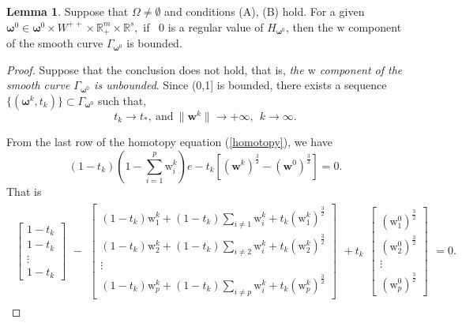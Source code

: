 \documentclass[11pt,pdflatex,sn-mathphys-ay]{sn-jnl}%
\theoremstyle{definition}
\theoremstyle{thmstyleone}%
\theoremstyle{thmstyletwo}%
\newtheorem{lemma}{Lemma}%
\theoremstyle{thmstylethree}%
\begin{document}
	\begin{lemma}\label{fenliangyoujie}
		Suppose that $\Omega \ne \emptyset$ and conditions (A), (B)
		hold. For a given $\bm{\omega}^0\in \bm{\omega}^0\times  W^{++} \times
		\mathbb{R}^{m}_{+}\times \mathbb{R}^s,$ if ~$  0 $ is a regular
		value of $H_{\bm{\omega}^0}$, then the $\text{w}$ component of the smooth curve
		$\Gamma_{\bm{\omega}^0}$ is bounded.
	\end{lemma}
	\vspace{-0.5cm}
	\begin{proof} Suppose that the conclusion does not hold, that is, \textit{the $\text{w}$ component of the smooth curve
			$\Gamma_{\bm{\omega}^0}$ is unbounded}. Since (0,1]
		is bounded, there exists a sequence
		$\{(\bm{\omega}^k,t_k)\}\subset\Gamma_{\bm{\omega}^0}$
		such that,
		$$  t_k\rightarrow t_*, ~
		\text{and}~ \|\textbf{w} ^k\|\rightarrow +\infty,~~k\rightarrow
		\infty.$$
		
		\noindent From the last row of the homotopy equation (\ref{homotopy}), we have
		\begin{equation}
			(1-t_k)(1-\sum_{i=1}^p \text{w}_i^k)e-t_k [(\textbf{w}^{k})^{\frac{3}{2}} -(\textbf{w}^0)^{\frac{3}{2}}] =0 . \label{4d}
		\end{equation}
		That is
		\begin{equation}\label{w}
			\begin{split}
				\begin{matrix}
					\begin{bmatrix}
						1-t_k\\
						1-t_k\\
						\vdots\\
						1-t_k
					\end{bmatrix}
				\end{matrix}-
				\begin{matrix}
					\begin{bmatrix}
						(1-t_k)\text{w}_1^{k}+(1-t_k)\sum\limits_{i \neq 1}\text{w}_i^{k} + t_k (\text{w}_1^{k})^\frac{3}{2}\\
						(1-t_k)\text{w}_2^{k}+(1-t_k)\sum\limits_{i\neq2}\text{w}_i^{k} + t_k (\text{w}_2^{k})^\frac{3}{2}\\
						\vdots\\
						(1-t_k)\text{w}_p^k+(1-t_k)\sum\limits_{i\neq p}\text{w}_i^{k} + t_k (\text{w}_p^{k})^\frac{3}{2}
					\end{bmatrix}
				\end{matrix}+t_k\begin{matrix}
					\begin{bmatrix}
						(\text{w}^0_1)^\frac{3}{2}\\
						(\text{w}^0_2)^\frac{3}{2}\\
						\vdots\\
						(\text{w}^0_p)^\frac{3}{2}
					\end{bmatrix}
				\end{matrix}
				=0. \end{split} \end{equation}
		

\end{proof}
\end{document}
